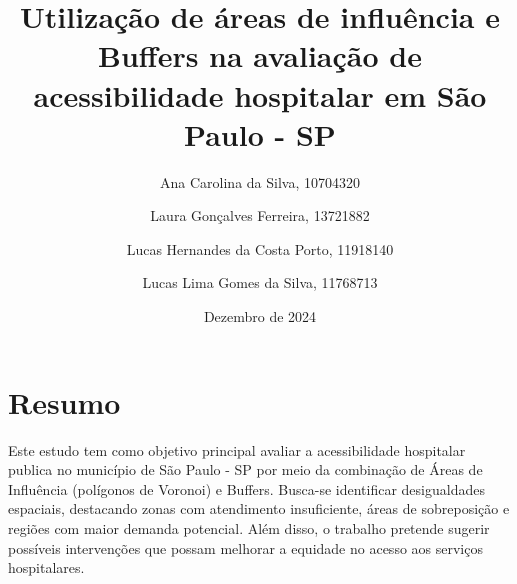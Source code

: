 \documentclass[
  8pt,
]{article}
\title{Utilização de áreas de influência e Buffers na avaliação de
acessibilidade hospitalar em São Paulo - SP}
\author{Ana Carolina da Silva, 10704320 \and Laura Gonçalves Ferreira,
13721882 \and Lucas Hernandes da Costa Porto, 11918140 \and Lucas Lima
Gomes da Silva, 11768713}
\date{Dezembro de 2024}
\begin{document}
\maketitle

\section{Resumo}\label{resumo}

Este estudo tem como objetivo principal avaliar a acessibilidade
hospitalar publica no município de São Paulo - SP por meio da combinação
de Áreas de Influência (polígonos de Voronoi) e Buffers. Busca-se
identificar desigualdades espaciais, destacando zonas com atendimento
insuficiente, áreas de sobreposição e regiões com maior demanda
potencial. Além disso, o trabalho pretende sugerir possíveis
intervenções que possam melhorar a equidade no acesso aos serviços
hospitalares.

\vspace{1cm}
\end{document}
